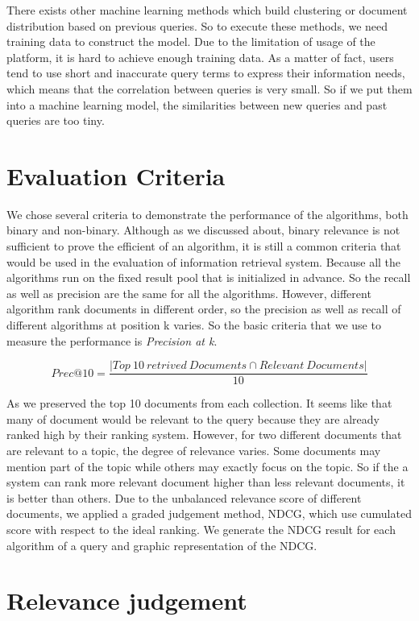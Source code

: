 There exists other machine learning methods which build clustering or document distribution based on previous queries. So to execute these methods, we need training data to construct the model. Due to the limitation of usage of the platform, it is hard to achieve enough training data. As a matter of fact, users tend to use short and inaccurate query terms to express their information needs, which means that the correlation between queries is very small. So if we put them into a machine learning model, the similarities between new queries and past queries are too tiny. 

\section{Evaluation Criteria}
We chose  several criteria to demonstrate the performance of the algorithms, both binary and non-binary. Although as we discussed about, binary relevance is not sufficient to prove the efficient of an algorithm, it is still a common criteria that would be used in the evaluation of information retrieval system. Because all the algorithms run on the fixed result pool that is initialized in advance. So the recall as well as precision are the same for all the algorithms. However, different algorithm rank documents in different order, so the precision as well as recall of different algorithms at position k varies. So the basic criteria that we use to measure the performance is \textit{Precision at k}.

\begin{equation}
\label{eq:prec10}
Prec@10=\frac{|Top\ 10\ retrived\ Documents\cap Relevant\ Documents|}{10}
\end{equation}

As we preserved the top 10 documents from each collection. It seems like that many of document would be relevant to the query because they are already ranked high by their ranking system. However, for two different documents that are relevant to a topic, the degree of relevance varies. Some documents may mention part of the topic while others may exactly focus on the topic. So if the a system can rank more relevant document higher than less relevant documents, it is better than others. Due to the unbalanced relevance score of different documents, we applied a graded judgement method, NDCG, which use cumulated score with respect to the ideal ranking. We generate the NDCG result for each algorithm of a query and graphic representation of the NDCG.

\section{Relevance judgement}


